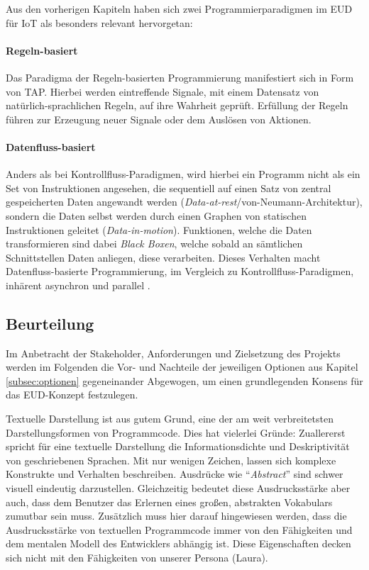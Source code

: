 Aus den vorherigen Kapiteln haben sich zwei Programmierparadigmen im \ac{EUD} für \ac{IoT} als besonders relevant hervorgetan:

\paragraph{Regeln-basiert} Das Paradigma der Regeln-basierten Programmierung manifestiert sich in Form von \ac{TAP}. Hierbei werden eintreffende Signale, mit einem Datensatz von natürlich-sprachlichen Regeln, auf ihre Wahrheit geprüft. Erfüllung der Regeln führen zur Erzeugung neuer Signale oder dem Auslösen von Aktionen. 

\paragraph{Datenfluss-basiert} Anders als bei Kontrollfluss-Paradigmen, wird hierbei ein Programm nicht als ein Set von Instruktionen angesehen, die sequentiell auf einen Satz von zentral gespeicherten Daten angewandt werden (\textit{Data-at-rest}/von-Neumann-Architektur), sondern die Daten selbst werden durch einen Graphen von statischen Instruktionen geleitet (\textit{Data-in-motion}). Funktionen, welche die Daten transformieren sind dabei \textit{Black Boxen}, welche sobald an sämtlichen Schnittstellen Daten anliegen, diese verarbeiten. Dieses Verhalten macht Datenfluss-basierte Programmierung, im Vergleich zu Kontrollfluss-Paradigmen, inhärent asynchron und parallel \cite{johnston2004advances}.

\subsection{Beurteilung}
Im Anbetracht der Stakeholder, Anforderungen und Zielsetzung des Projekts werden im Folgenden die Vor- und Nachteile der jeweiligen Optionen aus Kapitel \ref{subsec:optionen} gegeneinander Abgewogen, um einen grundlegenden Konsens für das \ac{EUD}-Konzept festzulegen.

Textuelle Darstellung ist aus gutem Grund, eine der am weit verbreitetsten Darstellungsformen von Programmcode. Dies hat vielerlei Gründe: Zuallererst spricht für eine textuelle Darstellung die Informationsdichte und Deskriptivität von geschriebenen Sprachen. Mit nur wenigen Zeichen, lassen sich komplexe Konstrukte und Verhalten beschreiben. Ausdrücke wie "`\textit{Abstract}"' sind schwer visuell eindeutig darzustellen.  Gleichzeitig bedeutet diese Ausdrucksstärke aber auch, dass dem Benutzer das Erlernen eines großen, abstrakten Vokabulars zumutbar sein muss. Zusätzlich muss hier darauf hingewiesen werden, dass die Ausdrucksstärke von textuellen Programmcode immer von den Fähigkeiten und dem mentalen Modell des Entwicklers abhängig ist. Diese Eigenschaften decken sich nicht mit den Fähigkeiten von unserer Persona (Laura).

